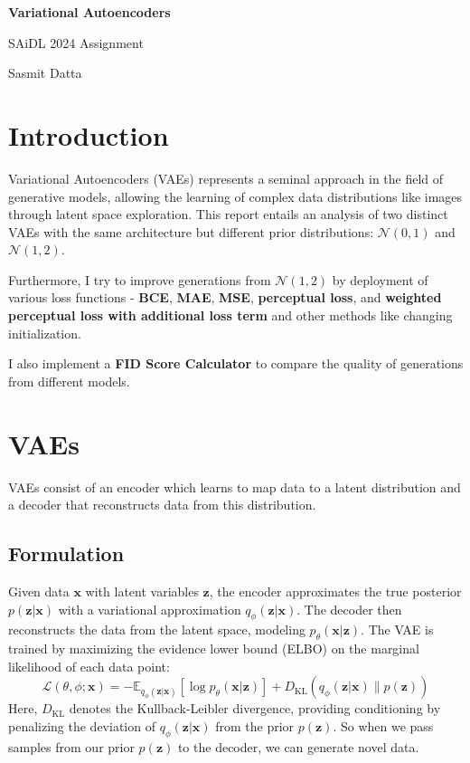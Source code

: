 \documentclass[12pt]{article}
\begin{document}
\begin{titlepage}
\centering
\vspace{0.5cm}
{\Huge\bfseries Variational Autoencoders\par}

\vspace{0.5cm} %
{\Large SAiDL 2024 Assignment}

\vspace{1.5cm}
{\Large Sasmit Datta}
\end{titlepage}

\section{Introduction}
Variational Autoencoders (VAEs) represents a seminal approach in the field of generative models, allowing the learning of complex data distributions like images through latent space exploration. This report entails an analysis of two distinct VAEs
with the same architecture but different prior distributions: $\mathcal{N}(0,1)$ and $\mathcal{N}(1,2)$.

Furthermore, I try to improve generations from $\mathcal{N}(1,2)$ by deployment of various loss functions - \textbf{BCE}, \textbf{MAE}, \textbf{MSE}, \textbf{perceptual loss}, and \textbf{weighted perceptual loss with additional loss term} and other methods like changing initialization.

I also implement a \textbf{FID Score Calculator} to compare the quality of generations from different models.

\section{VAEs}
VAEs consist of an encoder which learns to map data to a latent distribution and a decoder that reconstructs data from this distribution.

\subsection{Formulation}
Given data $\mathbf{x}$ with latent variables $\mathbf{z}$, the encoder approximates the true posterior $p(\mathbf{z}|\mathbf{x})$ with a variational approximation $q_{\phi}(\mathbf{z}|\mathbf{x})$. The decoder then reconstructs the data from the latent space, modeling $p_{\theta}(\mathbf{x}|\mathbf{z})$. The VAE is trained by maximizing the evidence lower bound (ELBO) on the marginal likelihood of each data point:
$$\mathcal{L}(\theta, \phi; \mathbf{x}) = -\mathbb{E}_{q_\phi(\mathbf{z}|\mathbf{x})}[\log p_\theta(\mathbf{x}|\mathbf{z})] + D_{\text{KL}}(q_\phi(\mathbf{z}|\mathbf{x}) \| p(\mathbf{z}))$$
Here, $D_{\text{KL}}$ denotes the Kullback-Leibler divergence, providing conditioning by penalizing the deviation of $q_\phi(\mathbf{z}|\mathbf{x})$ from the prior $p(\mathbf{z})$. So when we pass samples from our prior $p(\mathbf{z})$ to the decoder, we can generate novel data.
\end{document}
